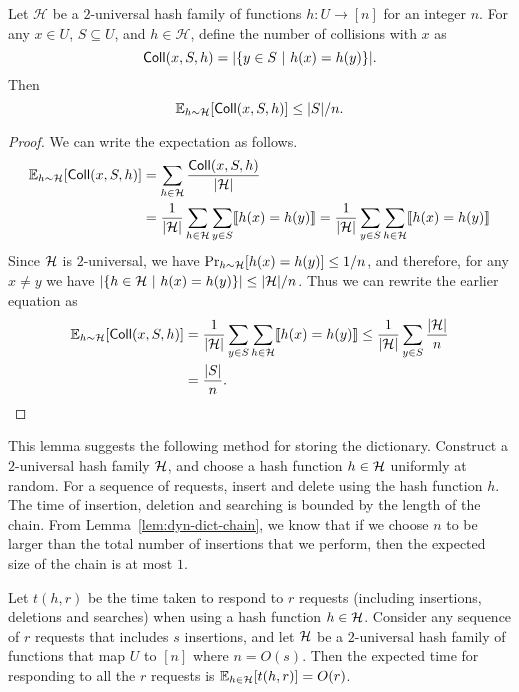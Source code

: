 \begin{lemma}
  Let $\mathcal{H}$ be a $2$-universal hash family of functions $h:U\to [n]$ for
  an integer $n$. For any $x\in U$, $S\subseteq U$, and $h\in \mathcal{H}$,
  define the number of collisions with $x$ as
  $$\textup{\textsf{Coll}}(x,S,h) = |\{y\in S ~|~ h(x) = h(y) \}|.$$ Then
  $$\mathbb{E}_{h \sim \mathcal{H}} [\textup{\textsf{Coll}}(x,S,h)] \leq |S|/n.$$
  \label{lem:dyn-dict-chain}
\end{lemma}
\begin{proof}
  We can write the expectation as follows.
  \begin{align*}
    \mathbb{E}_{h\sim\mathcal{H}}[\textsf{Coll}(x,S,h)] &= \sum_{h\in \mathcal{H}} \frac{\textsf{Coll}(x,S,h)}{|{\cal H}|}\\
    & = \frac{1}{|{\cal H}|} \sum_{h\in {\cal H}} \sum_{y\in S} \llbracket h(x) = h(y)\rrbracket  = \frac{1}{|{\cal H}|} \sum_{y\in S}\sum_{h\in {\cal H}} \llbracket h(x) = h(y)\rrbracket
  \end{align*}
  Since ${\cal H}$ is $2$-universal, we have $\Pr_{h\sim {\cal H}}[h(x) = h(y)] \leq 1/n$, and therefore, for any $x\neq y$ we have $|\{ h\in {\cal H} ~|~ h(x) = h(y)\}| \leq |{\cal H}|/n$. Thus we can rewrite the earlier equation as
  \begin{align*}
    \mathbb{E}_{h\sim\mathcal{H}}[\textsf{Coll}(x,S,h)] &= \frac{1}{|{\cal H}|} \sum_{y\in S}\sum_{h\in {\cal H}} \llbracket h(x) = h(y)\rrbracket \leq \frac{1}{|{\cal H}|} \sum_{y\in S} \frac{|{\cal H}|}{n}\\
    &= \frac{|S|}{n}.
  \end{align*}
\end{proof}

This lemma suggests the following method for storing the dictionary. Construct a
$2$-universal hash family ${\cal H}$, and choose a hash function $h\in {\cal H}$
uniformly at random. For a sequence of requests, insert and delete using the
hash function $h$. The time of insertion, deletion and searching is bounded by
the length of the chain. From Lemma~\ref{lem:dyn-dict-chain}, we know that if we
choose $n$ to be larger than the total number of insertions that we perform,
then the expected size of the chain is at most $1$.
\begin{theorem}
  Let $t(h,r)$ be the time taken to respond to $r$ requests (including
  insertions, deletions and searches) when using a hash function
  $h\in {\cal H}$. Consider any sequence of $r$ requests that includes $s$
  insertions, and let ${\cal H}$ be a $2$-universal hash family of functions
  that map $U$ to $[n]$ where $n=O(s)$. Then the expected time for responding to
  all the $r$ requests is $\mathbb{E}_{h\in {\cal H}} [ t(h,r) ] = O(r)$.
  \label{thm:dy-dict-bound}
\end{theorem}

